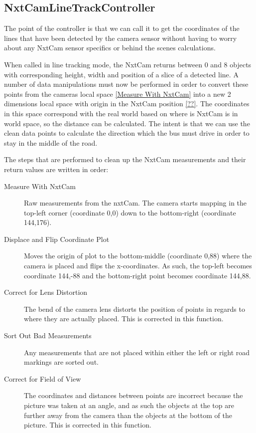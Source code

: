 \subsection{NxtCamLineTrackController}

The point of the controller is that we can call it to get the coordinates of the lines that have been detected by the camera sensor without having to worry about any NxtCam sensor specifics or behind the scenes calculations. 

When called in line tracking mode, the NxtCam returns between 0 and 8 objects with corresponding height, width and position of a slice of a detected line. A number of data manipulations must now be performed in order to convert these points from the cameras local space \ref{Measure With NxtCam} into a new 2 dimensions local space with origin in the NxtCam position \ref{??}. The coordinates in this space correspond with the real world based on where is NxtCam is in world space, so the distance can be calculated. The intent is that we can use the clean data points to calculate the direction which the bus must drive in order to stay in the middle of the road. 

The steps that are performed to clean up the NxtCam measurements and their return values are written in order: 


\begin{description}
    \item[Measure With NxtCam]
    Raw measurements from the nxtCam. The camera starts mapping in the top-left corner (coordinate 0,0) down to the bottom-right (coordinate 144,176).
    \item[Displace and Flip Coordinate Plot]
    Moves the origin of plot to the bottom-middle (coordinate 0,88) where the camera is placed and flips the x-coordinates. As such, the top-left becomes coordinate 144,-88 and the bottom-right point becomes coordinate 144,88. 
    \item[Correct for Lens Distortion]
    The bend of the camera lens distorts the position of points in regards to where they are actually placed. This is corrected in this function. 
    \item[Sort Out Bad Measurements]
    Any measurements that are not placed within either the left or right road markings are sorted out. 
    \item[Correct for Field of View]
    The coordinates and distances between points are incorrect because the picture was taken at an angle, and as such the objects at the top are further away from the camera than the objects at the bottom of the picture. This is corrected in this function. 
\end{description}


